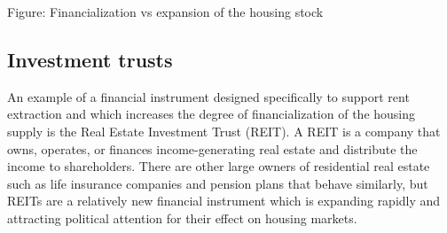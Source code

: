 \begin{center}
\end{center}

Figure: Financialization vs expansion of the housing stock 

\subsection{Investment trusts}

An example of a financial instrument designed specifically to support rent extraction and which  increases the degree of financialization of the housing supply is the  Real Estate Investment Trust (REIT).  A REIT is a company that owns, operates, or finances income-generating real estate and distribute the income to shareholders. There are other large owners of residential real estate such as life insurance companies and pension plans that behave similarly, but REITs are a relatively new financial instrument which is  expanding rapidly and attracting political attention for their effect on housing markets.  %

